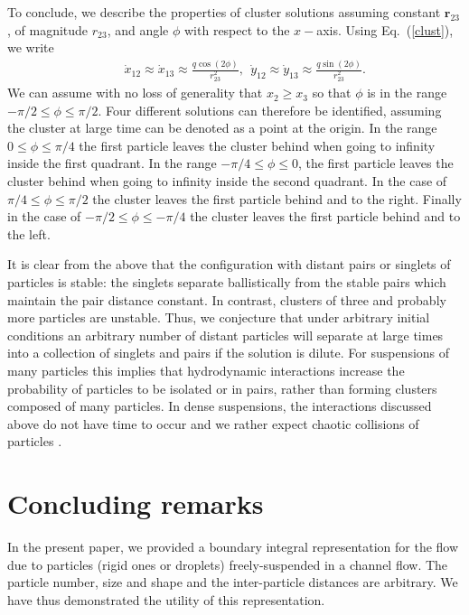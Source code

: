 To conclude, we describe the properties of cluster solutions assuming constant $\bm r_{23}$, of magnitude $r_{23}$, and angle $\phi$ with respect to the $x-$axis. Using Eq.~(\ref{clust}), we write
\begin{eqnarray}&&\!\!\!\!\!\!\!\!\!\!\!\!\!\!\!\!
\dot x_{12}\!\approx \dot x_{13}\approx \frac{q\cos(2\phi)}{r_{23}^2},\ \ \dot y_{12}\!\approx \dot y_{13}\approx \frac{q\sin(2\phi)}{r_{23}^2}. \nonumber
\end{eqnarray}
We can assume with no loss of generality that $x_2\geq x_3$ so that $\phi$ is in the range $-\pi/2\leq\phi\leq \pi/2$.
Four different solutions can therefore be identified, assuming the cluster at large time can be denoted as a point at the origin.
In the range $0\leq \phi\leq \pi/4$ the first particle leaves the cluster behind when going to infinity inside the first quadrant.
%
In the range $-\pi/4\leq \phi\leq 0$, the first particle leaves the cluster behind when going to infinity inside the second quadrant. In the case of $\pi/4\leq \phi\leq  \pi/2$ the cluster leaves the first particle behind and to the right. Finally in the case of $-\pi/2\leq \phi\leq  -\pi/4$ the cluster leaves the first particle behind and to the left.


It is clear from the above that the configuration with distant pairs or singlets of particles is stable: the singlets separate ballistically from the stable pairs which maintain the pair 
distance constant. 
In contrast, clusters of three and probably more particles are unstable.  Thus, we conjecture that under arbitrary initial conditions an arbitrary number of distant particles will 
separate at large times into a collection of singlets and pairs if the solution is dilute. For suspensions of many particles this implies that hydrodynamic interactions increase the 
probability of particles to be isolated or in pairs, rather than forming clusters composed of many particles. In dense suspensions, the interactions discussed above do not have 
time to occur and we rather expect chaotic collisions of particles \cite{tl2014}.

\section{Concluding remarks}

In the present paper, we provided a boundary integral representation for the flow due to particles (rigid ones or droplets) freely-suspended in a channel flow. The particle number, size and shape and the inter-particle distances are arbitrary.
We have thus demonstrated the utility of this representation.

